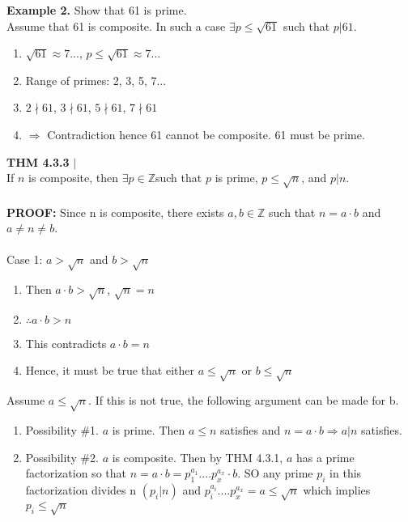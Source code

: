 \documentclass [12pt]{article}
\begin{document}
\noindent\textbf{Example 2.} Show that 61 is prime.\\
\vspace{0.1in}
\quad Assume that 61 is composite. In such a case $\exists p \leq \sqrt{61}$ such that $p|61$.
\begin{enumerate}[\quad]
    \item $\sqrt{61}\approx7...$, $p\leq\sqrt{61}\approx7...$
    \item Range of primes: 2, 3, 5, 7...
    \item $2\nmid61$, $3\nmid61$, $5\nmid61$, $7\nmid61$
    \item $\Rightarrow$ Contradiction hence 61 cannot be composite. 61 must be prime.
\end{enumerate}
\begin{framed}
\noindent\textbf{THM 4.3.3} $|$ \\
If $n$ is composite, then $\exists p\in\mathbb{Z}$such that $p$ is prime, $p\leq\sqrt{n}$, and $p|n$.\\\\
\textbf{PROOF:} Since n is composite, there exists $a,b\in\mathbb{Z}$ such that $n=a\cdot b$ and $a\neq n \neq b$.\\\\
Case 1: $a > \sqrt{n}$ and $b>\sqrt{n}$
\begin{enumerate}[\quad]
    \item Then $a\cdot b > \sqrt{n}$, $\sqrt{n} = n$
    \item $\therefore a \cdot b > n$
    \item This contradicts $a\cdot b = n$
    \item Hence, it must be true that either $a \leq \sqrt{n}$ or $b \leq \sqrt{n}$
\end{enumerate}
Assume $a\leq \sqrt{n}$. If this is not true, the following argument can be made for b.
\begin{enumerate}[\quad]
    \item Possibility \#1. $a$ is prime. Then $a\leq n$ satisfies and $n=a\cdot b\Rightarrow a|n$ satisfies.
    \item Possibility \#2. $a$ is composite. Then by THM 4.3.1, $a$ has a prime factorization so that $n=a\cdot b = p_1^{a_1}....p_x^{a_x}\cdot b$. SO any prime $p_i$ in this factorization divides n $(p_i|n)$ and $ p_i^{a_i}....p_x^{a_x} = a \leq \sqrt{n}$ which implies $p_i\leq \sqrt{n}$
\end{enumerate}
\end{framed}
\end{document}
